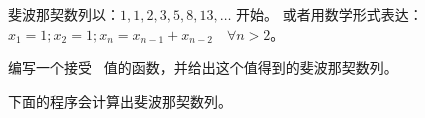 \begin{Exercise}[title={斐波那契},difficulty=5]
\label{ex:fibonaci}
\Question\label{ex:fibonaci q1}
斐波那契数列以：$1, 1, 2, 3, 5, 8, 13, \ldots$ 开始。
或者用数学形式表达：$ x_1 = 1; x_2 = 1; x_n = x_{n-1} +
x_{n-2}\quad\forall n > 2 $。

编写一个接受~ 值的函数，并给出这个值得到的斐波那契数列。

\end{Exercise}

\begin{Answer}
\Question
下面的程序会计算出斐波那契数列。


\showremarks
\end{Answer}
